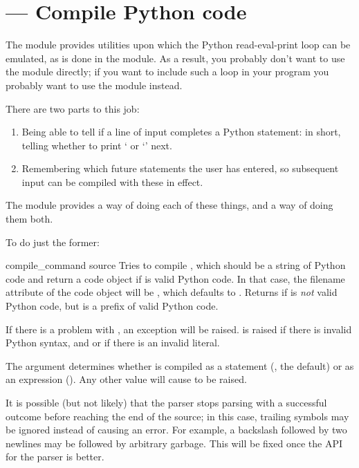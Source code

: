 \section{ ---
         Compile Python code}



The  module provides utilities upon which the Python
read-eval-print loop can be emulated, as is done in the
 module.  As a result, you probably don't want to use
the module directly; if you want to include such a loop in your
program you probably want to use the  module instead.

There are two parts to this job: 

\begin{enumerate}
  \item Being able to tell if a line of input completes a Python 
        statement: in short, telling whether to print
        `\code{>\code{>}>~} or `' next.
  \item Remembering which future statements the user has entered, so 
        subsequent input can be compiled with these in effect.
\end{enumerate}

The  module provides a way of doing each of these
things, and a way of doing them both.

To do just the former:

\begin{funcdesc}{compile_command}
                {source}
Tries to compile , which should be a string of Python
code and return a code object if  is valid
Python code. In that case, the filename attribute of the code object
will be , which defaults to .
Returns  if  is \emph{not} valid Python
code, but is a prefix of valid Python code.

If there is a problem with , an exception will be raised.
 is raised if there is invalid Python syntax,
and  or  if there is an
invalid literal.

The  argument determines whether  is compiled
as a statement (, the default) or as an expression
().  Any other value will cause  to 
be raised.

It is possible (but not likely) that the parser stops parsing
with a successful outcome before reaching the end of the source;
in this case, trailing symbols may be ignored instead of causing an
error.  For example, a backslash followed by two newlines may be
followed by arbitrary garbage.  This will be fixed once the API
for the parser is better.
\end{funcdesc}

